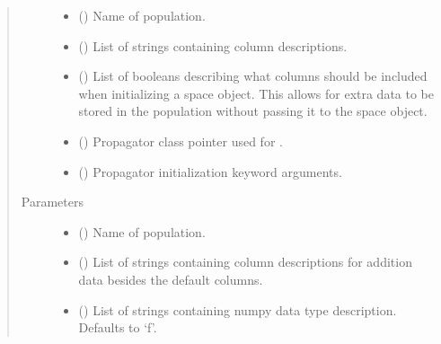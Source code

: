 \documentclass[letterpaper,10pt,english]{sphinxmanual}
\begin{document}
\begin{fulllineitems}
\begin{quote}
\begin{description}
\begin{itemize}
\item {} 
 () \textendash{} Name of population.

\item {} 
 () \textendash{} List of strings containing column descriptions.

\item {} 
 () \textendash{} List of booleans describing what columns should be included when initializing a space object. This allows for extra data to be stored in the population without passing it to the space object.

\item {} 
 ({\hyperref[\detokenize{modules/propagator_base:propagator_base.PropagatorBase}]{}}) \textendash{} Propagator class pointer used for {\hyperref[\detokenize{modules/space_object:space_object.SpaceObject}]{}}.

\item {} 
 () \textendash{} Propagator initialization keyword arguments.

\end{itemize}

\item[{Parameters}] \leavevmode\begin{itemize}
\item {} 
 () \textendash{} Name of population.

\item {} 
 () \textendash{} List of strings containing column descriptions for addition data besides the default columns.

\item {} 
 () \textendash{} List of strings containing numpy data type description. Defaults to ‘f’.


\end{itemize}
\end{description}
\end{quote}
\end{fulllineitems}
\end{document}
